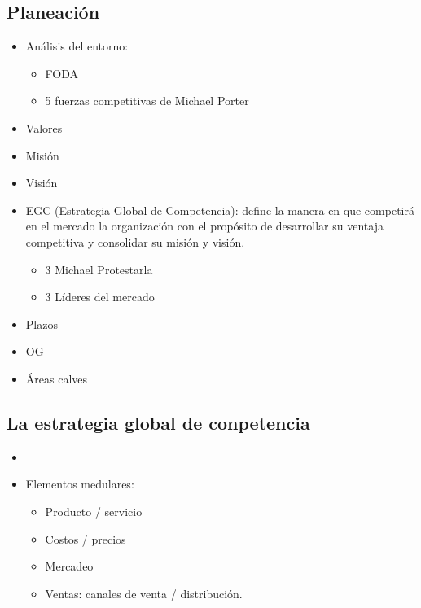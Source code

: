 \subsection{Planeación}
\begin{itemize}
    \item Análisis del entorno:
        \begin{itemize}
            \item FODA 
            \item 5 fuerzas competitivas de Michael Porter 
        \end{itemize}
        
    \item Valores     
    \item Misión 
    \item Visión     
    \item EGC (Estrategia Global de Competencia): define la manera en que competirá en el mercado la organización con el propósito de desarrollar su ventaja competitiva y consolidar su misión y visión.
        \begin{itemize}
            \item 3 Michael Protestarla 
            \item 3 Líderes del mercado
        \end{itemize}
    
    \item Plazos
    \item OG
    \item Áreas calves 
\end{itemize}


\subsection{La estrategia global de conpetencia}
\begin{itemize}
    \item {} 
    \item Elementos medulares:
    \begin{itemize}
        \item Producto / servicio
        \item Costos / precios 
        \item Mercadeo 
        \item Ventas: canales de venta / distribución.
    \end{itemize}
\end{itemize}


